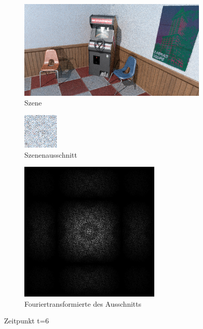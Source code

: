 \begin{figure}[H]
    \begin{subfigure}{\textwidth}   
        \centering \includegraphics[scale=.25]{content/TemporalerAlg/Bilder/Sorting/Screenshots/seed_debug_8.0_selection.png}
        \caption{Szene}
        \label{fig:Nur_Sorting_Szene_t6}
    \end{subfigure}
    \begin{subfigure}{0.5\textwidth}
        \centering\includegraphics[width=0.4\linewidth]{content/TemporalerAlg/Bilder/Sorting/Screenshots/seed_debug_8.0_ausschnitt.png} 
        \caption{Szenenausschnitt}
        \label{fig:Nur_Sorting_ausschnitt_t6}
    \end{subfigure}
    \begin{subfigure}{0.5\textwidth}
        \centering\includegraphics[width=0.4\linewidth]{content/TemporalerAlg/Bilder/Sorting/Screenshots/Spektren/seed_debug_8.0_ausschnitt.png}
        \caption{Fouriertransformierte des Ausschnitts}
        \label{fig:Nur_Sorting_Fouriertransformierte_t6}
    \end{subfigure}
        \caption{Zeitpunkt t=6}
        \label{fig:Nur_Sorting_Verlauf_t6}
\end{figure}


